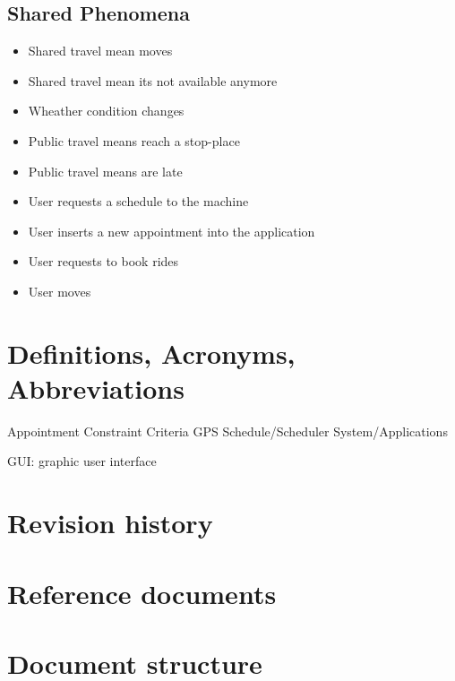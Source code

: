 \subsection{Shared Phenomena}
\begin{itemize}
\item Shared travel mean moves
\item Shared travel mean its not available anymore
\item Wheather condition changes
\item Public travel means reach a stop-place
\item Public travel means are late 
\item User requests a schedule to the machine
\item User inserts a new appointment into the application
\item User requests to book rides
\item User moves
\end{itemize}

\section{Definitions, Acronyms, Abbreviations}

Appointment
Constraint
Criteria
GPS
Schedule/Scheduler
System/Applications

GUI: graphic user interface


\section{Revision history}

\section{Reference documents}

\section{Document structure}